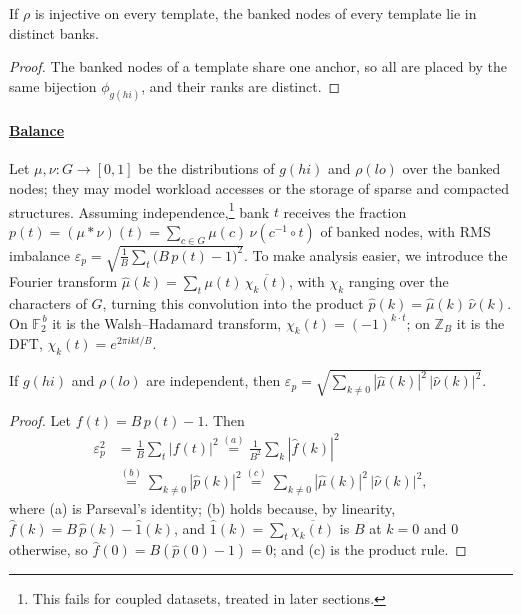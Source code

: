 \begin{theorem}\label{thm:conflict}
	If $\rho$ is injective on every template, the banked nodes of every template lie in
	distinct banks.
\end{theorem}

\begin{proof}
	The banked nodes of a template share one anchor, so all are placed by the same bijection
	$\phi_{g(hi)}$, and their ranks are distinct.
\end{proof}

\paragraph{\underline{Balance}}
Let $\mu, \nu : G \to [0,1]$ be the distributions of $g(hi)$ and $\rho(lo)$ over the
banked nodes; they may model workload accesses or the storage of sparse and compacted
structures. Assuming independence,\footnote{This fails for coupled datasets, treated in later sections.} bank $t$ receives the fraction
$p(t) = (\mu \ast \nu)(t) = \sum_{c \in G} \mu(c)\,\nu(c^{-1} \circ t)$ of banked nodes,
with RMS imbalance
$\varepsilon_p = \sqrt{\frac{1}{B}\sum_t \bigl(B\,p(t) - 1\bigr)^2}$. To make
analysis easier, we introduce the Fourier
transform $\hat\mu(k) = \sum_{t} \mu(t)\,\overline{\chi_k(t)}$, with $\chi_k$ ranging over
the characters of $G$, turning this convolution into the product
$\hat p(k) = \hat\mu(k)\,\hat\nu(k)$. On $\mathbb{F}_2^{\,b}$ it is the Walsh--Hadamard
transform, $\chi_k(t) = (-1)^{k \cdot t}$; on $\mathbb{Z}_B$ it is the DFT,
$\chi_k(t) = e^{2\pi i k t/B}$.

\begin{theorem}[Balance]\label{thm:balance}
	If $g(hi)$ and $\rho(lo)$ are independent, then
	$\varepsilon_p = \sqrt{\sum_{k \neq 0} |\hat\mu(k)|^2\,|\hat\nu(k)|^2}$.
\end{theorem}

\begin{proof}
	Let $f(t) = B\,p(t) - 1$. Then
	$$
		\begin{aligned}
			\varepsilon_p^2
			 & = \frac{1}{B}\sum_t |f(t)|^2
			\overset{(a)}{=} \frac{1}{B^2}\sum_k |\hat f(k)|^2 \\
			 & \overset{(b)}{=} \sum_{k \neq 0} |\hat p(k)|^2
			\overset{(c)}{=} \sum_{k \neq 0} |\hat\mu(k)|^2\,|\hat\nu(k)|^2 ,
		\end{aligned}
	$$
	where (a) is Parseval's identity; (b) holds because, by linearity,
	$\hat f(k) = B\,\hat p(k) - \hat 1(k)$, and $\hat 1(k) = \sum_t \overline{\chi_k(t)}$ is
	$B$ at $k = 0$ and $0$ otherwise, so $\hat f(0) = B(\hat p(0) - 1) = 0$; and (c) is the
	product rule.
\end{proof}

